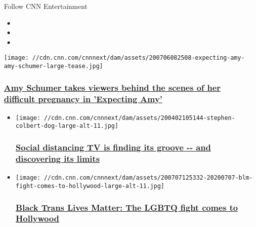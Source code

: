 Follow CNN Entertainment

\begin{itemize}
\item
\item
\item
\end{itemize}

\href{/2020/07/08/entertainment/expecting-amy-review/index.html}{}

\texttt{[image: //cdn.cnn.com/cnnnext/dam/assets/200706082508-expecting-amy-amy-schumer-large-tease.jpg]}

\hypertarget{amy-schumer-takes-viewers-behind-the-scenes-of-her-difficult-pregnancy-in-expecting-amy}{%
\subsubsection{\texorpdfstring{\href{/2020/07/08/entertainment/expecting-amy-review/index.html}{Amy
Schumer takes viewers behind the scenes of her difficult pregnancy in
'Expecting
Amy'}}{Amy Schumer takes viewers behind the scenes of her difficult pregnancy in 'Expecting Amy'}}\label{amy-schumer-takes-viewers-behind-the-scenes-of-her-difficult-pregnancy-in-expecting-amy}}

\begin{itemize}
\item
  \href{/2020/04/17/entertainment/social-distancing-tv/index.html}{}

  \texttt{[image: //cdn.cnn.com/cnnnext/dam/assets/200402105144-stephen-colbert-dog-large-alt-11.jpg]}

  \hypertarget{social-distancing-tv-is-finding-its-groove----and-discovering-its-limits}{%
  \subsubsection{\texorpdfstring{\href{/2020/04/17/entertainment/social-distancing-tv/index.html}{Social
  distancing TV is finding its groove -\/- and discovering its
  limits}}{Social distancing TV is finding its groove -\/- and discovering its limits}}\label{social-distancing-tv-is-finding-its-groove----and-discovering-its-limits}}
\end{itemize}

\begin{itemize}
\item
  \href{/2020/07/09/entertainment/entertainment-newsletter/index.html}{}

  \texttt{[image: //cdn.cnn.com/cnnnext/dam/assets/200707125332-20200707-blm-fight-comes-to-hollywood-large-alt-11.jpg]}

  \hypertarget{black-trans-lives-matter-the-lgbtq-fight-comes-to-hollywood}{%
  \subsubsection{\texorpdfstring{\href{/2020/07/09/entertainment/entertainment-newsletter/index.html}{Black
  Trans Lives Matter: The LGBTQ fight comes to
  Hollywood}}{Black Trans Lives Matter: The LGBTQ fight comes to Hollywood}}\label{black-trans-lives-matter-the-lgbtq-fight-comes-to-hollywood}}
\end{itemize}

